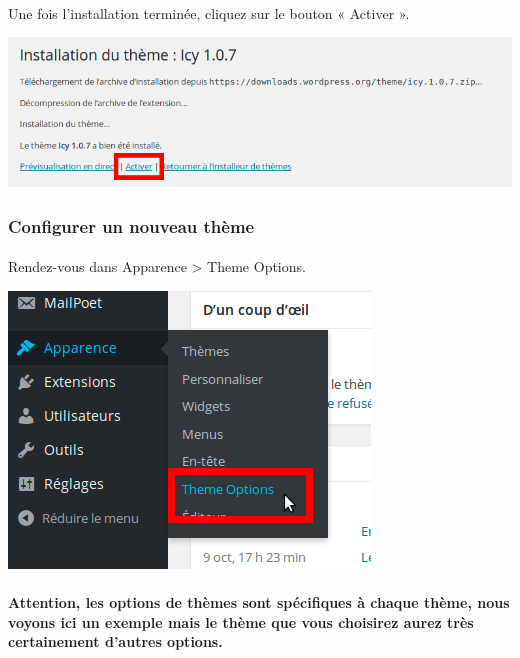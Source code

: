 \documentclass[10pt,a4paper]{article}
\begin{document}
\paragraph{}Une fois l'installation terminée, cliquez sur le bouton « Activer ».
\begin{center}
\includegraphics[scale=0.3]{img/0245.png}
\end{center}
\subsubsection{Configurer un nouveau thème}
\paragraph{}Rendez-vous dans Apparence > Theme Options.
\begin{center}
\includegraphics[scale=0.3]{img/0246.png}
\end{center}
\paragraph{}\textbf{Attention, les options de thèmes sont spécifiques à chaque thème, nous voyons ici un exemple mais le thème que vous choisirez aurez très certainement d'autres options.}
\end{document}
